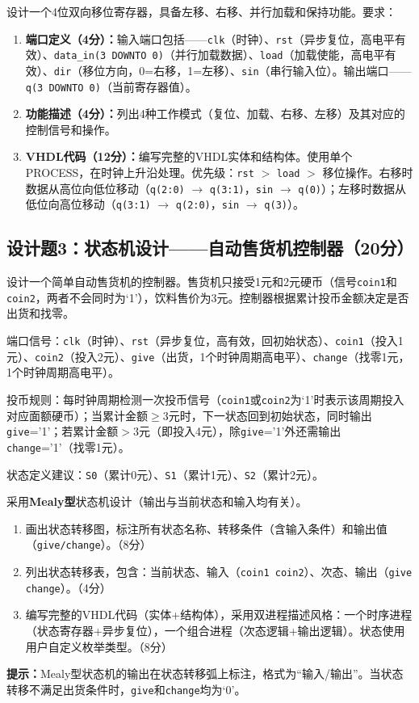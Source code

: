 设计一个4位双向移位寄存器，具备左移、右移、并行加载和保持功能。要求：

\begin{enumerate}[label=(\arabic*)]
  \item \textbf{端口定义（4分）：}输入端口包括——\texttt{clk}（时钟）、\texttt{rst}（异步复位，高电平有效）、\texttt{data\_in(3 DOWNTO 0)}（并行加载数据）、\texttt{load}（加载使能，高电平有效）、\texttt{dir}（移位方向，0=右移，1=左移）、\texttt{sin}（串行输入位）。输出端口——\texttt{q(3 DOWNTO 0)}（当前寄存器值）。
  \item \textbf{功能描述（4分）：}列出4种工作模式（复位、加载、右移、左移）及其对应的控制信号和操作。
  \item \textbf{VHDL代码（12分）：}编写完整的VHDL实体和结构体。使用单个PROCESS，在时钟上升沿处理。优先级：\texttt{rst} $>$ \texttt{load} $>$ 移位操作。右移时数据从高位向低位移动（\texttt{q(2:0)} $\to$ \texttt{q(3:1)}，\texttt{sin} $\to$ \texttt{q(0)}）；左移时数据从低位向高位移动（\texttt{q(3:1)} $\to$ \texttt{q(2:0)}，\texttt{sin} $\to$ \texttt{q(3)}）。
\end{enumerate}

\newpage

\subsection*{设计题3：状态机设计——自动售货机控制器（20分）}

设计一个简单自动售货机的控制器。售货机只接受1元和2元硬币（信号\texttt{coin1}和\texttt{coin2}，两者不会同时为‘1’），饮料售价为3元。控制器根据累计投币金额决定是否出货和找零。

端口信号：\texttt{clk}（时钟）、\texttt{rst}（异步复位，高有效，回初始状态）、\texttt{coin1}（投入1元）、\texttt{coin2}（投入2元）、\texttt{give}（出货，1个时钟周期高电平）、\texttt{change}（找零1元，1个时钟周期高电平）。

投币规则：每时钟周期检测一次投币信号（\texttt{coin1}或\texttt{coin2}为‘1’时表示该周期投入对应面额硬币）；当累计金额$\ge 3$元时，下一状态回到初始状态，同时输出\texttt{give}='1'；若累计金额$>3$元（即投入4元），除\texttt{give}='1'外还需输出\texttt{change}='1'（找零1元）。

状态定义建议：\texttt{S0}（累计0元）、\texttt{S1}（累计1元）、\texttt{S2}（累计2元）。

采用\textbf{Mealy型}状态机设计（输出与当前状态和输入均有关）。

\begin{enumerate}[label=(\arabic*)]
  \item 画出状态转移图，标注所有状态名称、转移条件（含输入条件）和输出值（\texttt{give/change}）。（8分）
  \item 列出状态转移表，包含：当前状态、输入（\texttt{coin1 coin2}）、次态、输出（\texttt{give change}）。（4分）
  \item 编写完整的VHDL代码（实体+结构体），采用双进程描述风格：一个时序进程（状态寄存器+异步复位），一个组合进程（次态逻辑+输出逻辑）。状态使用用户自定义枚举类型。（8分）
\end{enumerate}

\begin{framed}
\textbf{提示：}Mealy型状态机的输出在状态转移弧上标注，格式为“输入/输出”。当状态转移不满足出货条件时，\texttt{give}和\texttt{change}均为‘0’。
\end{framed}

\endinput
